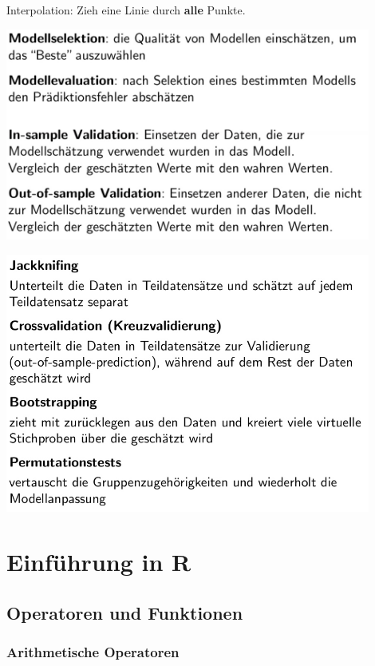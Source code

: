 \documentclass[
]{article}
\begin{document}
Interpolation: Zieh eine Linie durch \textbf{alle} Punkte.

\includegraphics[width=12cm, center]{Fig14}

\includegraphics[width=12cm, center]{Fig15}\clearpage \clearpage

\appendix

\hypertarget{einfuxfchrung-in-r}{%
\section{Einführung in R}\label{einfuxfchrung-in-r}}

\hypertarget{operatoren-und-funktionen}{%
\subsection{Operatoren und Funktionen}\label{operatoren-und-funktionen}}

\hypertarget{arithmetische-operatoren}{%
\subsubsection{Arithmetische
Operatoren}\label{arithmetische-operatoren}}
\end{document}
